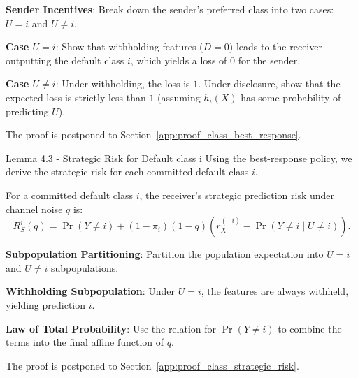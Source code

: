 \begin{guideblock}
\item \textbf{Sender Incentives}: Break down the sender's preferred class into two cases: $U=i$ and $U \ne i$.
\item \textbf{Case $U=i$}: Show that withholding features ($D=0$) leads to the receiver outputting the default class $i$, which yields a loss of $0$ for the sender.
\item \textbf{Case $U \ne i$}: Under withholding, the loss is $1$. Under disclosure, show that the expected loss is strictly less than $1$ (assuming $h_i(X)$ has some probability of predicting $U$).
\end{guideblock}
The proof is postponed to Section~\ref{app:proof_class_best_response}.

\begin{sourceblock}{Lemma 4.3 - Strategic Risk for Default class i}
Using the best-response policy, we derive the strategic risk for each committed default class $i$.
\begin{lemma}
\label{lem:class_strategic_risk}
For a committed default class $i$, the receiver's strategic prediction risk under channel noise $q$ is:
\begin{equation}
    \label{eq:class_strategic_risk}
    R^i_S(q) = \Pr(Y \ne i) + (1 - \pi_i)(1 - q)\left( r^{(-i)}_X - \Pr(Y \ne i \mid U \ne i) \right).
\end{equation}
\end{lemma}
\end{sourceblock}

\begin{guideblock}
\item \textbf{Subpopulation Partitioning}: Partition the population expectation into $U=i$ and $U \ne i$ subpopulations.
\item \textbf{Withholding Subpopulation}: Under $U=i$, the features are always withheld, yielding prediction $i$.
\item {}
\item \textbf{Law of Total Probability}: Use the relation for $\Pr(Y \ne i)$ to combine the terms into the final affine function of $q$.
\end{guideblock}
The proof is postponed to Section~\ref{app:proof_class_strategic_risk}.

